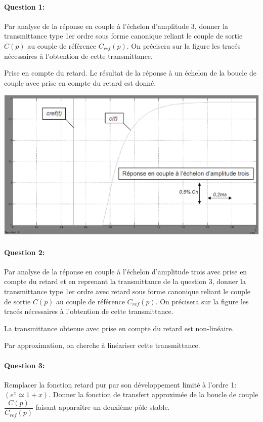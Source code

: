 \paragraph{Question 1:} Par analyse de la réponse en couple à l'échelon d'amplitude 3, donner la transmittance type 1er ordre sous forme canonique reliant le couple de sortie $C(p)$ au couple de référence $C_{ref}(p)$. On précisera sur la figure les tracés nécessaires à l'obtention de cette transmittance.

Prise en compte du retard. Le résultat de la réponse à un échelon de la boucle de couple avec prise en compte du retard est donné.

\begin{center}
 \includegraphics[width=0.8\linewidth]{img/img21}
\end{center}

\paragraph{Question 2:} Par analyse de la réponse en couple à l'échelon d'amplitude trois avec prise en compte du retard et en reprenant la transmittance de la question 3, donner la transmittance type 1er ordre avec retard sous forme canonique reliant le couple de sortie $C(p)$ au couple de référence $C_{ref}(p)$. On précisera sur la figure les tracés nécessaires à l'obtention de cette transmittance.

La transmittance obtenue avec prise en compte du retard est non-linéaire.

Par approximation, on cherche à linéariser cette transmittance.

\paragraph{Question 3:} Remplacer la fonction retard pur par son développement limité à l'ordre 1: $(e^x\simeq 1+x)$. Donner la fonction de transfert approximée de la boucle de couple $\dfrac{C(p)}{C_{ref}(p)}$ faisant apparaître un deuxième pôle stable.


